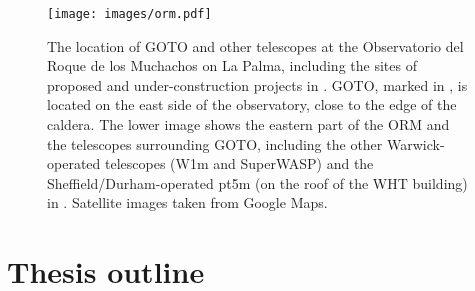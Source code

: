 \begin{colsection}
\begin{figure}[p]
    \begin{center}
        \texttt{[image: images/orm.pdf]}
    \end{center}
    \caption[The location of GOTO and other telescopes on La Palma]{
        The location of GOTO and other telescopes at the Observatorio del Roque de los Muchachos on La Palma, including the sites of proposed and under-construction projects in . GOTO, marked in , is located on the east side of the observatory, close to the edge of the caldera. The lower image shows the eastern part of the ORM and the telescopes surrounding GOTO, including the other Warwick-operated telescopes (W1m and SuperWASP) and the Sheffield/Durham-operated pt5m (on the roof of the WHT building) in . Satellite images taken from Google Maps.
    }\label{fig:orm}
\end{figure}

\newpage

\end{colsection}


\section{Thesis outline}
\label{sec:outline}


